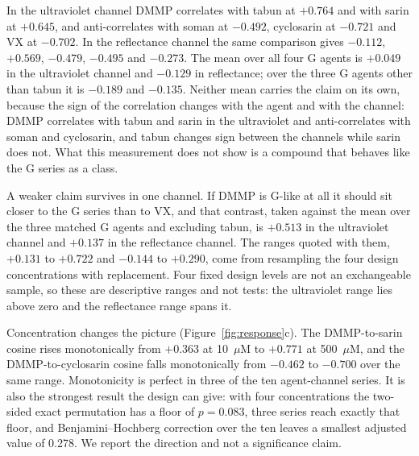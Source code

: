 \documentclass[journal=jacsat,manuscript=article,margin=1in]{achemso}
\begin{document}
In the ultraviolet channel DMMP correlates with tabun at $+0.764$ and with
sarin at $+0.645$, and anti-correlates with soman at $-0.492$, cyclosarin
at $-0.721$ and VX at $-0.702$. In the reflectance channel the same
comparison gives $-0.112$, $+0.569$, $-0.479$, $-0.495$ and $-0.273$. %
The mean
over all four G agents is $+0.049$ in the ultraviolet channel and $-0.129$
in reflectance; over the three G agents other than tabun it is $-0.189$ and
$-0.135$. Neither mean carries the claim on its own, because the sign of
the correlation changes with the agent and with the channel: DMMP
correlates with tabun and sarin in the ultraviolet and anti-correlates with
soman and cyclosarin, and tabun changes sign between the channels while
sarin does not. What this measurement does not show is a compound that
behaves like the G series as a class.

A weaker claim survives in one channel. If DMMP is G-like at all it should
sit closer to the G series than to VX, and that contrast, taken against the
mean over the three matched G agents and excluding tabun, is $+0.513$ in the
ultraviolet channel and $+0.137$ in the reflectance channel. The ranges
quoted with them, $+0.131$ to $+0.722$ and $-0.144$ to $+0.290$, come from
resampling the four design concentrations with replacement. Four fixed design
levels are not an exchangeable sample, so these are descriptive ranges and
not tests: the ultraviolet range lies above zero and the reflectance range
spans it.

Concentration changes the picture (Figure~\ref{fig:response}c). The
DMMP-to-sarin cosine rises monotonically from $+0.363$ at 10~$\mu$M to
$+0.771$ at 500~$\mu$M, and the DMMP-to-cyclosarin cosine falls
monotonically from $-0.462$ to $-0.700$ over the same range. Monotonicity
is perfect in three of the ten agent-channel series. It is also the
strongest result the design can give: with four concentrations the
two-sided exact permutation has a floor of $p=0.083$, three series reach
exactly that floor, and Benjamini--Hochberg correction over the ten leaves
a smallest adjusted value of 0.278. We report the direction and not a
significance claim.
\end{document}
